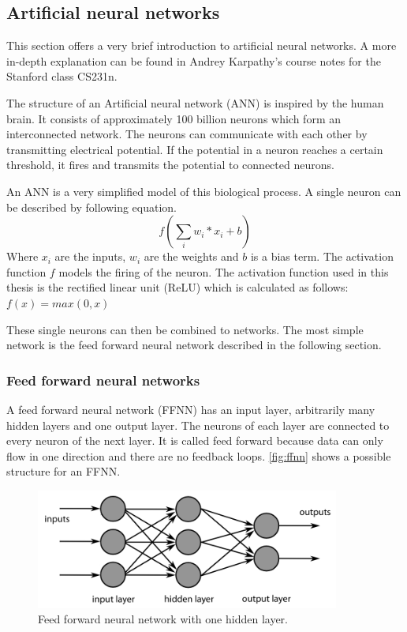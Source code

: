 \documentclass[12pt]{article}
\begin{document}
\subsection{Artificial neural networks}
\label{subsec:ann}
This section offers a very brief introduction to artificial neural networks. A more in-depth explanation can be found in Andrey Karpathy's course notes for the Stanford class CS231n. \cite{karpathy}

The structure of an Artificial neural network (ANN) is inspired by the human brain. It consists of approximately 100 billion neurons which form an interconnected network. The neurons can communicate with each other by transmitting electrical potential. If the potential in a neuron reaches a certain threshold, it fires and transmits the potential to connected neurons. \cite{kruse_2016}

An ANN is a very simplified model of this biological process. A single neuron can be described by following equation. $$f\left(\sum_{i}w_i*x_i+b\right)$$ Where $x_i$ are the inputs, $w_i$ are the weights and $b$ is a bias term. The activation function $f$ models the firing of the neuron. The activation function used in this thesis is the rectified linear unit (ReLU) which is calculated as follows: $f(x)=max(0,x)$

These single neurons can then be combined to networks. The most simple network is the feed forward neural network described in the following section.

\subsubsection{Feed forward neural networks}
\label{subsubsec:ffnn}
A feed forward neural network (FFNN) has an input layer, arbitrarily many hidden layers and one output layer. The neurons of each layer are connected to every neuron of the next layer. It is called feed forward because data  can only flow in one direction and there are no feedback loops. \autoref{fig:ffnn} shows a possible structure for an FFNN.

\begin{figure}[ht]
\includegraphics[width=10cm]{ffnn}	
\caption{Feed forward neural network with one hidden layer.}
\label{fig:ffnn}
\end{figure}
\end{document}
